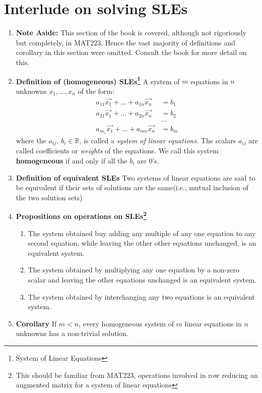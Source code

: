 \documentclass[oneside, 12pt]{book}
\newcommand{\settag}[1]{\renewcommand{\theenumi}{#1}}
\newcommand{\R}{\mathbb{R}}
\newcommand{\tbf}[1]{\textbf{#1}}
\newcommand{\tit}[1]{\textit{#1}}
\begin{document}
\section{Interlude on solving SLEs}
    \begin{enumerate}
        \settag{1.5.*}
        \item \tbf{Note Aside: }This section of the book is covered, although not rigoriously but completely, in MAT223. Hence the vast majority of definitions and corollary in this section were omitted. Consult the book for more detail on this.
        
        \settag{1.5.1}
        \item \tbf{Definition of (homogeneous) SLEs\footnote{System of Linear Equations}} A system of $m$ equations in $n$ unknowns $x_1,...,x_n$ of the form:
        \begin{align*}
            a_{11}\vec{x_1}+...+a_{1n}\vec{x_n} &= b_1 \\
            a_{21}\vec{x_1}+...+a_{2n}\vec{x_n} &= b_2 \\
            &\mbox{...} \\
            a_{m_1}\vec{x_1}+...+a_{mn}\vec{x_n} &= b_m
        \end{align*}
        where the $a_{ij},~b_i\in \R$, is called a \tit{system of linear equations.} The scalars $a_{ij}$ are called coefficients or \tit{weights} of the equations. We call this system \textbf{homogeneous} if and only if all the $b_i$ are 0's.
        
        \settag{1.5.2}
        \item \tbf{Definition of equivalent SLEs} Two systems of linear equations are said to be equivalent if their sets of solutions are the same(i.e., mutual inclusion of the two solution sets)
        
        \settag{1.5.3}
        \item \tbf{Propositions on operations on SLEs\footnote{This should be familiar from MAT223, operations involved in row reducing an augmented matrix for a system of linear equations}}
        \begin{enumerate}
            \item The system obtained buy adding any multiple of any one equation to any second equation, while leaving the other other equations unchanged, is an equivalent system.
            \item The system obtained by multiplying any one equation by a non-zero scalar and leaving the other equations unchanged is an equivalent system.
            \item The system obtained by interchanging any two equations is an equivalent system.
        \end{enumerate}
        
        \settag{1.5.13}
        \item \tbf{Corollary} If $m<n$, every homogeneous system of $m$ linear equations in $n$ unknowns has a non-trivial solution.
    \end{enumerate}
    
\end{document}
